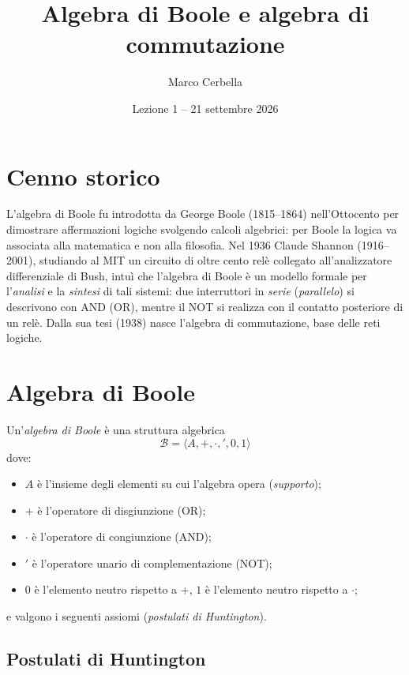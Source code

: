 \documentclass[11pt,a4paper]{article}
\title{Algebra di Boole e algebra di commutazione}
\author{Marco Cerbella}
\date{Lezione 1 -- 21 settembre 2026}
\begin{document}
\maketitle

\section*{Cenno storico}

L'algebra di Boole fu introdotta da George Boole (1815--1864) nell'Ottocento per
dimostrare affermazioni logiche svolgendo calcoli algebrici: per Boole la
logica va associata alla matematica e non alla filosofia. Nel 1936 Claude
Shannon (1916--2001), studiando al MIT un circuito di oltre cento relè
collegato all'analizzatore differenziale di Bush, intuì che l'algebra di Boole
è un modello formale per l'\emph{analisi} e la \emph{sintesi} di tali sistemi:
due interruttori in \emph{serie} (\emph{parallelo}) si descrivono con AND (OR),
mentre il NOT si realizza con il contatto posteriore di un relè. Dalla sua tesi
(1938) nasce l'algebra di commutazione, base delle reti logiche.

\section{Algebra di Boole}

\begin{definizione}
Un'\emph{algebra di Boole} è una struttura algebrica
\[
  \mathcal{B} = \langle A, +, \cdot, ', 0, 1 \rangle
\]
dove:
\begin{itemize}
    \item $A$ è l'insieme degli elementi su cui l'algebra opera (\emph{supporto});
    \item $+$ è l'operatore di disgiunzione (OR);
    \item $\cdot$ è l'operatore di congiunzione (AND);
    \item $'$ è l'operatore unario di complementazione (NOT);
    \item $0$ è l'elemento neutro rispetto a $+$, $1$ è l'elemento neutro
          rispetto a $\cdot$;
\end{itemize}
e valgono i seguenti assiomi (\emph{postulati di Huntington}).
\end{definizione}

\subsection{Postulati di Huntington}
\end{document}
